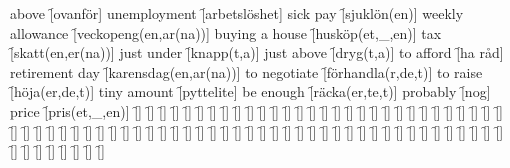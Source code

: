 \begin{questions}
\begin{multicols}{2}
        \question above \f[ovanför]
        \question unemployment \f[arbetslöshet]
        \question sick pay \f[sjuklön(en)]
        \question weekly allowance \f[veckopeng(en,ar(na))]
        \question buying a house \f[husköp(et,\_,en)]
        \question tax \f[skatt(en,er(na))]
        \question just under \f[knapp(t,a)]
        \question just above \f[dryg(t,a)]
        \question to afford \f[ha råd]
        \question retirement day \f[karensdag(en,ar(na))]
        \question to negotiate \f[förhandla(r,de,t)]
        \question to raise \f[höja(er,de,t)]
        \question tiny amount \f[pyttelite]
        \question be enough \f[räcka(er,te,t)]
        \question probably \f[nog]
        \question price \f[pris(et,\_,en)]
        \question  \f[]
        \question  \f[]
        \question  \f[]
        \question  \f[]
        \question  \f[]
        \question  \f[]
        \question  \f[]
        \question  \f[]
        \question  \f[]
        \question  \f[]
        \question  \f[]
        \question  \f[]
        \question  \f[]
        \question  \f[]
        \question  \f[]
        \question  \f[]
        \question  \f[]
        \question  \f[]
        \question  \f[]
        \question  \f[]
        \question  \f[]
        \question  \f[]
        \question  \f[]
        \question  \f[]
        \question  \f[]
        \question  \f[]
        \question  \f[]
        \question  \f[]
        \question  \f[]
        \question  \f[]
        \question  \f[]
        \question  \f[]
        \question  \f[]
        \question  \f[]
        \question  \f[]
        \question  \f[]
        \question  \f[]
        \question  \f[]
        \question  \f[]
        \question  \f[]
        \question  \f[]
        \question  \f[]
        \question  \f[]
        \question  \f[]
        \question  \f[]
        \question  \f[]
        \question  \f[]
        \question  \f[]
        \question  \f[]
        \question  \f[]
        \question  \f[]
        \question  \f[]
        \question  \f[]
        \question  \f[]
        \question  \f[]
        \question  \f[]
        \question  \f[]
        \question  \f[]
        \question  \f[]
        \question  \f[]
        \question  \f[]
        \question  \f[]
        \question  \f[]
        \question  \f[]
        \question  \f[]
        \question  \f[]
        \question  \f[]
        \question  \f[]
        \question  \f[]
        \question  \f[]
        \question  \f[]
        \question  \f[]
        \question  \f[]
        \question  \f[]
        \question  \f[]
        \question  \f[]
        \question  \f[]
        \question  \f[]

\end{multicols}
\end{questions}
